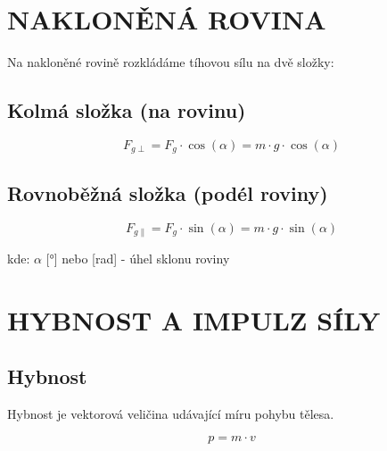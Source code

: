 \documentclass[a4paper,11pt]{article}
\begin{document}
\newpage

\section{NAKLONĚNÁ ROVINA}

\begin{definitionbox}
Na nakloněné rovině rozkládáme tíhovou sílu na dvě složky:
\end{definitionbox}

\subsection{Kolmá složka (na rovinu)}

\begin{equationbox}
\begin{equation*}
    F_{g\perp} = F_g \cdot \cos(\alpha) = m \cdot g \cdot \cos(\alpha)
\end{equation*}
\end{equationbox}

\subsection{Rovnoběžná složka (podél roviny)}

\begin{equationbox}
\begin{equation*}
    F_{g\parallel} = F_g \cdot \sin(\alpha) = m \cdot g \cdot \sin(\alpha)
\end{equation*}
\end{equationbox}

\begin{notebox}
kde: $\alpha$ [°] nebo [rad] - úhel sklonu roviny
\end{notebox}

\section{HYBNOST A IMPULZ SÍLY}

\subsection{Hybnost}

\begin{definitionbox}
Hybnost je vektorová veličina udávající míru pohybu tělesa.
\end{definitionbox}

\begin{equationbox}
\begin{equation*}
    p = m \cdot v
\end{equation*}
\end{equationbox}
\end{document}
